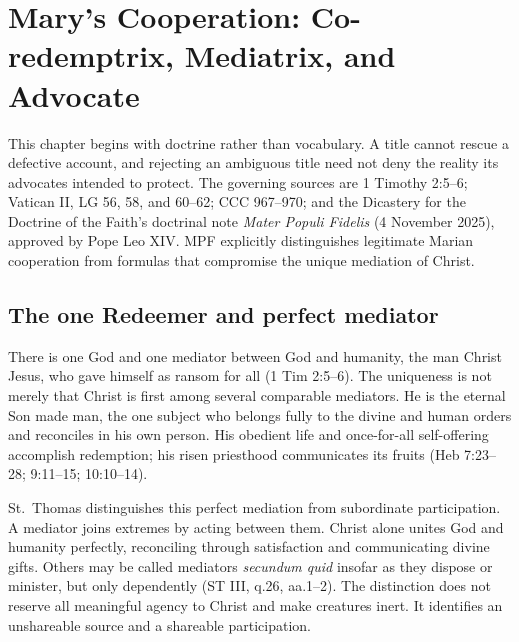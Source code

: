 \section{Mary's Cooperation: Co-redemptrix, Mediatrix, and Advocate}


This chapter begins with doctrine rather than vocabulary. A title cannot rescue a defective account, and rejecting an ambiguous title need not deny the reality its advocates intended to protect. The governing sources are 1 Timothy 2:5--6; Vatican II, LG 56, 58, and 60--62; CCC 967--970; and the Dicastery for the Doctrine of the Faith's doctrinal note \emph{Mater Populi Fidelis} (4 November 2025), approved by Pope Leo XIV. MPF explicitly distinguishes legitimate Marian cooperation from formulas that compromise the unique mediation of Christ.

\subsection{The one Redeemer and perfect mediator}

There is one God and one mediator between God and humanity, the man Christ Jesus, who gave himself as ransom for all (1 Tim 2:5--6). The uniqueness is not merely that Christ is first among several comparable mediators. He is the eternal Son made man, the one subject who belongs fully to the divine and human orders and reconciles in his own person. His obedient life and once-for-all self-offering accomplish redemption; his risen priesthood communicates its fruits (Heb 7:23--28; 9:11--15; 10:10--14).

St.~Thomas distinguishes this perfect mediation from subordinate participation. A mediator joins extremes by acting between them. Christ alone unites God and humanity perfectly, reconciling through satisfaction and communicating divine gifts. Others may be called mediators \emph{secundum quid} insofar as they dispose or minister, but only dependently (ST III, q.26, aa.1--2). The distinction does not reserve all meaningful agency to Christ and make creatures inert. It identifies an unshareable source and a shareable participation.

